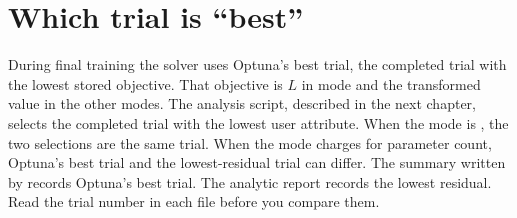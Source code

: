 \section{Which trial is ``best''}

During final training the solver uses Optuna's best trial, the completed trial with the lowest stored objective.
That objective is \(L\) in  mode and the transformed value in the other modes.
The analysis script, described in the next chapter, selects the completed trial with the lowest  user attribute.
When the mode is , the two selections are the same trial.
When the mode charges for parameter count, Optuna's best trial and the lowest-residual trial can differ.
The summary written by  records Optuna's best trial.
The analytic report records the lowest residual.
Read the trial number in each file before you compare them.
